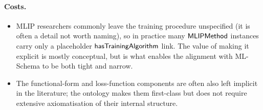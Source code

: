 \paragraph{Costs.}
\begin{itemize}
\item MLIP researchers commonly leave the training procedure
  unspecified (it is often a detail not worth naming), so in practice
  many $\mathsf{MLIPMethod}$ instances carry only a placeholder
  $\mathsf{hasTrainingAlgorithm}$ link. The value of making it explicit is
  mostly conceptual, but is what enables the alignment with
  ML-Schema to be both tight and narrow.
\item The functional-form and loss-function components are often also
  left implicit in the literature; the ontology makes them first-class
  but does not require extensive axiomatisation of their internal
  structure.
\end{itemize}

